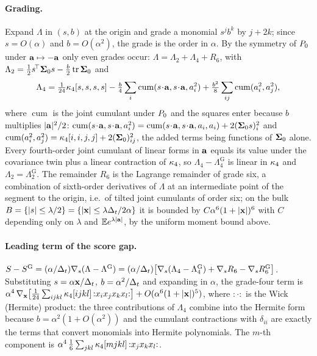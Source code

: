 \paragraph{Grading.}
Expand $\Lambda$ in $(s,b)$ at the origin and grade a monomial $s^{j}b^{k}$ by $j+2k$;
since $s=O(\alpha)$ and $b=O(\alpha^2)$, the grade is the order in $\alpha$. By the
symmetry of $P_0$ under $\mathbf{a}\mapsto-\mathbf{a}$ only even grades occur:
$\Lambda=\Lambda_2+\Lambda_4+R_6$, with
$\Lambda_2=\tfrac12s^{\!\top}\mathbf{\Sigma}_0s-\tfrac b2\operatorname{tr}\mathbf{\Sigma}_0$ and
\[
  \Lambda_4=\tfrac1{24}\kappa_4[s,s,s,s]
   -\tfrac b4\sum_i\operatorname{cum}(s\!\cdot\!\mathbf{a},s\!\cdot\!\mathbf{a},a_i^2)
   +\tfrac{b^2}8\sum_{ij}\operatorname{cum}(a_i^2,a_j^2),
\]
where $\operatorname{cum}$ is the joint cumulant under $P_0$ and the squares enter because
$b$ multiplies $|\mathbf{a}|^2/2$: $\operatorname{cum}(s\!\cdot\!\va,s\!\cdot\!\va,a_i^2)
=\operatorname{cum}(s\!\cdot\!\va,s\!\cdot\!\va,a_i,a_i)+2(\Sig_0s)_i^2$ and
$\operatorname{cum}(a_i^2,a_j^2)=\kappa_4[i,i,j,j]+2(\mathbf{\Sigma}_0)_{ij}^2$, the added terms being
functions of $\mathbf{\Sigma}_0$ alone. Every fourth-order joint cumulant of linear forms in $\mathbf{a}$
equals its value under the covariance twin plus a linear contraction of $\kappa_4$, so
$\Lambda_4-\Lambda_4^{\mathrm{G}}$ is linear in $\kappa_4$ and
$\Lambda_2=\Lambda_2^{\mathrm{G}}$. The remainder $R_6$ is the Lagrange
remainder of grade six, a combination of sixth-order derivatives of $\Lambda$ at an
intermediate point of the segment to the origin, i.e.\ of tilted joint cumulants of
order six; on the bulk $B=\{|s|\le\lambda/2\}=\{|\mathbf{x}|\le\lambda\Delta_t/2\alpha\}$ it is
bounded by $C\alpha^6(1+|\mathbf{x}|)^6$ with $C$ depending only on $\lambda$ and
$\mathbb{E} e^{\lambda|\mathbf{a}|}$, by the uniform moment bound above.

\paragraph{Leading term of the score gap.}
$S-S^{\mathrm{G}}=(\alpha/\Delta_t)\nabla_s(\Lambda-\Lambda^{\mathrm{G}})
=(\alpha/\Delta_t)\bigl[\nabla_s(\Lambda_4-\Lambda_4^{\mathrm{G}})+\nabla_sR_6-\nabla_sR_6^{\mathrm{G}}\bigr]$.
Substituting $s=\alpha\mathbf{x}/\Delta_t$, $b=\alpha^2/\Delta_t$ and expanding in $\alpha$, the
grade-four term is
$\alpha^4\,\nabla_{\mathbf{x}}\bigl[\tfrac1{24}\sum_{ijkl}\kappa_4[ijkl]\,{:}x_ix_jx_kx_l{:}\bigr]+O(\alpha^6(1+|\mathbf{x}|)^5)$,
where ${:}\cdot{:}$ is the Wick (Hermite) product: the three contributions of $\Lambda_4$
combine into the Hermite form because $b=\alpha^2(1+O(\alpha^2))$ and the cumulant
contractions with $\delta_{ii}$ are exactly the terms that convert monomials into Hermite
polynomials. The $m$-th component is $\alpha^4\,\tfrac16\sum_{jkl}\kappa_4[mjkl]\,{:}x_jx_kx_l{:}$.

